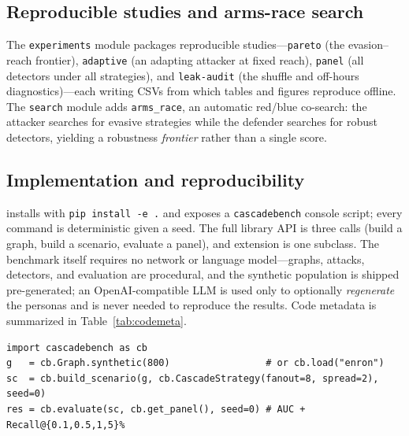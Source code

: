 \subsection{Reproducible studies and arms-race search}
The \texttt{experiments} module packages reproducible studies---\texttt{pareto} (the
evasion--reach frontier), \texttt{adaptive} (an adapting attacker at fixed reach),
\texttt{panel} (all detectors under all strategies), and \texttt{leak-audit} (the shuffle
and off-hours diagnostics)---each writing CSVs from which tables and figures reproduce
offline. The \texttt{search} module adds \texttt{arms\_race}, an automatic red/blue
co-search: the attacker searches for evasive strategies while the defender searches for
robust detectors, yielding a robustness \emph{frontier} rather than a single score.

\subsection{Implementation and reproducibility}
\tool installs with \texttt{pip install -e .} and exposes a \texttt{cascadebench} console
script; every command is deterministic given a seed. The full library API is three calls
(build a graph, build a scenario, evaluate a panel), and extension is one subclass. The
benchmark itself requires no network or language model---graphs, attacks, detectors, and
evaluation are procedural, and the synthetic population is shipped pre-generated; an
OpenAI-compatible LLM is used only to optionally \emph{regenerate} the personas and is never
needed to reproduce the results. Code metadata is summarized in Table~\ref{tab:codemeta}.

\begin{lstlisting}
import cascadebench as cb
g   = cb.Graph.synthetic(800)                 # or cb.load("enron")
sc  = cb.build_scenario(g, cb.CascadeStrategy(fanout=8, spread=2), seed=0)
res = cb.evaluate(sc, cb.get_panel(), seed=0) # AUC + Recall@{0.1,0.5,1,5}%
\end{lstlisting}

